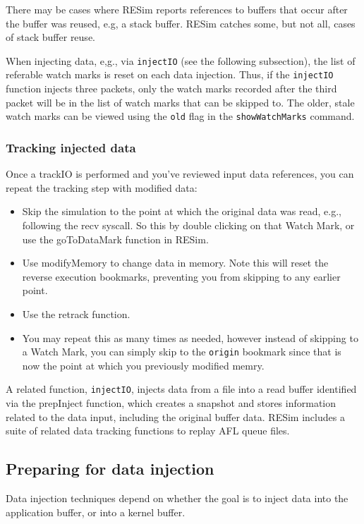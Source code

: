 \documentclass[titlepage]{article}
\begin{document}
There may be cases where RESim reports references to buffers that occur after the buffer was reused, e.g, a stack buffer.  RESim catches some, but not all,
cases of stack buffer reuse.

When injecting data, e,g., via {\tt injectIO} (see the following subsection), the list of referable watch marks is reset on each data injection.  Thus, if the {\tt injectIO} function injects
three packets, only the watch marks recorded after the third packet will be in the list of watch marks that can be skipped to.  The older, stale watch marks can
be viewed using the {\tt old} flag in the {\tt showWatchMarks} command.

\subsubsection{Tracking injected data}
Once a trackIO is performed and you've reviewed input data references, you can repeat the tracking step with modified data:
\begin{itemize}
\item Skip the simulation to the point at which the original data was read, e.g., following the recv syscall.  So this by double clicking
on that Watch Mark, or use the goToDataMark function in RESim.
\item Use modifyMemory to change data in memory.  Note this will reset the reverse execution bookmarks, preventing you from skipping to
any earlier point.
\item Use the retrack function.
\item You may repeat this as many times as needed, however instead of skipping to a Watch Mark, you can simply skip to the {\tt origin}
bookmark since that is now the point at which you previously modified memry.
\end{itemize}

A related function,  {\tt injectIO}, injects data from a file into a read buffer identified via the prepInject function, which creates a snapshot
and stores information related to the data input, including the original buffer data.
RESim includes a suite of related data tracking functions to replay AFL queue files.

\subsection{Preparing for data injection}
\label{prepInject}
Data injection techniques depend on whether the goal is to inject data into the application buffer, or into a kernel buffer.
\end{document}
